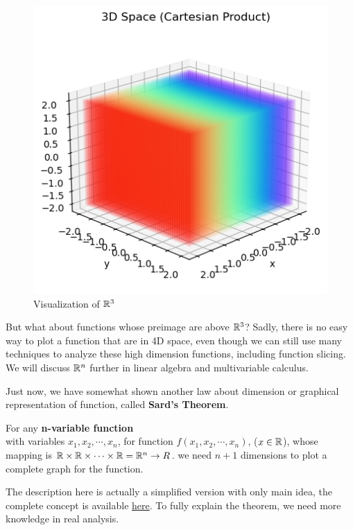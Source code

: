 		\begin{figure}[H]
			\centering
			\includegraphics[width=0.7\linewidth]{Images/R^3}
			\caption[]{Visualization of $\mathbb{R}^3$}
			\label{fig:r3}
		\end{figure}
		But what about functions whose preimage are above $\mathbb{R}^3$? Sadly, there is no easy way to plot a function that are in 4D space, even though we can still use many techniques to analyze these
		high dimension functions, including function slicing. We will discuss $\mathbb{R}^n$ further in linear algebra and multivariable calculus. 
		
		Just now, we have somewhat shown another law about dimension or graphical representation of function, called \textbf{Sard's Theorem}.
		\begin{theorem}
			For any \textbf{n-variable function}\\ with variables $x_1, x_2, \cdots, x_n$, for function $f(x_1,x_2,\cdots, x_n)$, ($x\in \mathbb{R}$), whose mapping is $\mathbb{R} \times \mathbb{R} \times \cdots \times \mathbb{R} = \mathbb{R}^n \to R$.
			we need $n+1$ dimensions to plot a complete graph for the function. 
		\end{theorem}
		\begin{remark}
			The description here is actually a simplified version with only main idea, the complete concept is available \href{https://www.wikiwand.com/en/Sard%27s_theorem}{here}. To fully
			explain the theorem, we need more knowledge in real analysis.
		\end{remark}
		
